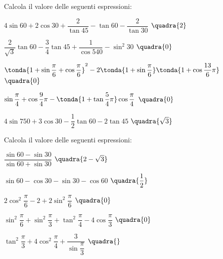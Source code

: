 \begin{esercizio}\label{ese:03.1}
Calcola il valore delle seguenti espressioni:
 \begin{enumeratea}
  \item  $4 \sin 60 + 2 \cos 30 + \dfrac{2}{\tan 45} - 
          \tan 60 - \dfrac{2}{\tan 30}$
   \hfill $\quadra{2}$
  \item  $\dfrac{2}{\sqrt{3}} \tan 60 - \dfrac{3}{4} \tan 45 + 
          \dfrac{1}{\cos 540} - \sin^2 30 $
   \hfill $\quadra{0}$
  \item  $\tonda{1 + \sin \dfrac{\pi}{6} + \cos \dfrac{\pi}{6}}^2 -
          2 \tonda{1 + \sin \dfrac{\pi}{6}} \tonda{1 + \cos \dfrac{13}{6}\pi}$
   \hfill $\quadra{0}$
  \item  $\sin \dfrac{\pi}{4} + \cos \dfrac{9}{4}\pi - 
          \tonda{1 + \tan \dfrac{5}{4}\pi} \cos \dfrac{\pi}{4}$
   \hfill $\quadra{0}$
  \item  $4 \sin 750 + 3 \cos 30 - \dfrac{1}{2} \tan 60 - 2 \tan 45$
   \hfill $\quadra{\sqrt{3}}$
 \end{enumeratea}
\end{esercizio}

\begin{esercizio}\label{ese:}
 Calcola il valore delle seguenti espressioni:
 \begin{enumeratea}
  \item  $\dfrac{\sin 60 - \sin 30}{\sin 60 + \sin 30}$
   \hfill $\quadra{2 - \sqrt{3}}$
  \item  $\sin 60 - \cos 30 - \sin 30 - \cos 60$
   \hfill $\quadra{\dfrac{1}{2}}$
  \item  $2 \cos^2 \dfrac{\pi}{6} - 2 + 2 \sin^2 \dfrac{\pi}{6}$
   \hfill $\quadra{0}$
  \item  $\sin^2 \dfrac{\pi}{6} + \sin^2 \dfrac{\pi}{3} +
          \tan^2 \dfrac{\pi}{4} - 4 \cos \dfrac{\pi}{3}$
   \hfill $\quadra{0}$
  \item  $\tan^2 \dfrac{\pi}{3} + 4 \cos^2 \dfrac{\pi}{4} + 
          \dfrac{3}{\sin \dfrac{\pi}{3}}$
   \hfill $\quadra{}$
 \end{enumeratea}
\end{esercizio}

